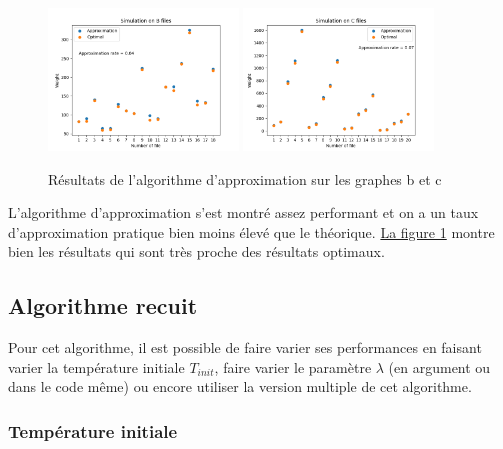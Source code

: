 \documentclass[11pt,french]{report}
\begin{document}
        \begin{figure}
        	\begin{center}
        		\includegraphics[width=0.45\textwidth]{plot_B.png}
        		\includegraphics[width=0.45\textwidth]{plot_C.png}
        	\end{center}
        	\caption{Résultats de l'algorithme d'approximation sur les graphes b et c}
        	\label{Figure1}
        \end{figure}
    
    	L'algorithme d'approximation s'est montré assez performant et on a un taux d'approximation pratique bien moins élevé que le théorique. \hyperref[Figure1]{La figure 1} montre bien les résultats qui sont très proche des résultats optimaux.
        


        \subsection{Algorithme recuit}

        Pour cet algorithme, il est possible de faire varier ses performances en faisant varier la température initiale $T_{init}$, faire varier le paramètre $\lambda$ (en argument ou dans le code même) ou encore utiliser la version multiple de cet algorithme.

        \subsubsection{Température initiale}
        
\end{document}
